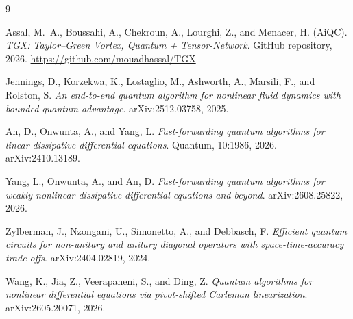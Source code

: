 \documentclass[10.5pt,twocolumn]{article}
\begin{document}
\begin{thebibliography}{9}

Assal, M.~A., Boussahi, A., Chekroun, A., Lourghi, Z., and Menacer, H. (AiQC).
\emph{TGX: Taylor--Green Vortex, Quantum + Tensor-Network}.
GitHub repository, 2026.
\url{https://github.com/mouadhassal/TGX}

Jennings, D., Korzekwa, K., Lostaglio, M., Ashworth, A., Marsili, F., and Rolston, S.
\emph{An end-to-end quantum algorithm for nonlinear fluid dynamics with bounded quantum advantage}.
arXiv:2512.03758, 2025.

An, D., Onwunta, A., and Yang, L.
\emph{Fast-forwarding quantum algorithms for linear dissipative differential equations}.
Quantum, 10:1986, 2026. arXiv:2410.13189.

Yang, L., Onwunta, A., and An, D.
\emph{Fast-forwarding quantum algorithms for weakly nonlinear dissipative differential equations and beyond}.
arXiv:2608.25822, 2026.

Zylberman, J., Nzongani, U., Simonetto, A., and Debbasch, F.
\emph{Efficient quantum circuits for non-unitary and unitary diagonal operators with space-time-accuracy trade-offs}.
arXiv:2404.02819, 2024.

Wang, K., Jia, Z., Veerapaneni, S., and Ding, Z.
\emph{Quantum algorithms for nonlinear differential equations via pivot-shifted Carleman linearization}.
arXiv:2605.20071, 2026.

\end{thebibliography}
\end{document}
